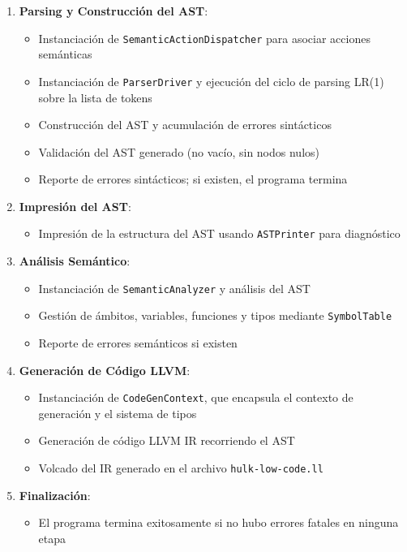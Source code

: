 \documentclass[11pt, a4paper, twoside]{article} %
\begin{document}
\begin{enumerate}
    \item \textbf{Parsing y Construcción del AST}:
    \begin{itemize}
        \item Instanciación de \texttt{SemanticActionDispatcher} para asociar acciones semánticas
        \item Instanciación de \texttt{ParserDriver} y ejecución del ciclo de parsing LR(1) sobre la lista de tokens
        \item Construcción del AST y acumulación de errores sintácticos
        \item Validación del AST generado (no vacío, sin nodos nulos)
        \item Reporte de errores sintácticos; si existen, el programa termina
    \end{itemize}

    \item \textbf{Impresión del AST}:
    \begin{itemize}
        \item Impresión de la estructura del AST usando \texttt{ASTPrinter} para diagnóstico
    \end{itemize}

    \item \textbf{Análisis Semántico}:
    \begin{itemize}
        \item Instanciación de \texttt{SemanticAnalyzer} y análisis del AST
        \item Gestión de ámbitos, variables, funciones y tipos mediante \texttt{SymbolTable}
        \item Reporte de errores semánticos si existen
    \end{itemize}

    \item \textbf{Generación de Código LLVM}:
    \begin{itemize}
        \item Instanciación de \texttt{CodeGenContext}, que encapsula el contexto de generación y el sistema de tipos
        \item Generación de código LLVM IR recorriendo el AST
        \item Volcado del IR generado en el archivo \texttt{hulk-low-code.ll}
    \end{itemize}

    \item \textbf{Finalización}:
    \begin{itemize}
        \item El programa termina exitosamente si no hubo errores fatales en ninguna etapa
    \end{itemize}
\end{enumerate}
\end{document}
